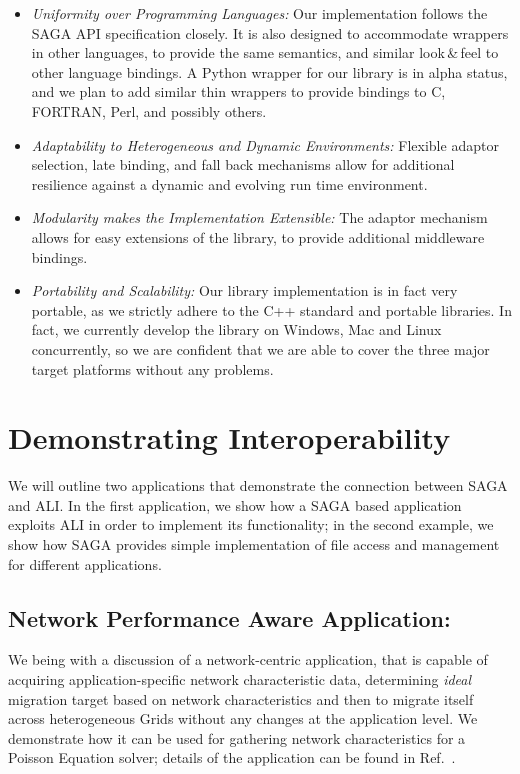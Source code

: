 \documentclass[conference,final]{IEEEtran}
\newcommand{\I}{\textit}
\newenvironment{shortlist}{
  \begin{itemize}
  \setlength{\itemsep}{-0.1em}
}{
  \end{itemize}
}
\begin{document}
\begin{shortlist}
\item \I{Uniformity over Programming Languages:} Our implementation
  follows the SAGA API specification closely. It is also designed to
  accommodate wrappers in other languages, to provide the same
  semantics, and similar look\,\&\,feel to other language bindings.  A
  Python wrapper for our library is in alpha status, and we plan to
  add similar thin wrappers to provide bindings to C, FORTRAN, Perl,
  and possibly others.
\item \I{Adaptability to Heterogeneous and Dynamic Environments:}
  Flexible adaptor selection, late binding, and fall back mechanisms
  allow for additional resilience against a dynamic and evolving run
  time environment.
\item \I{Modularity makes the Implementation Extensible:} The
  adaptor mechanism allows for easy extensions of the library, to
  provide additional middleware bindings.
\item \I{Portability and Scalability:} Our library implementation is
  in fact very portable, as we strictly adhere to the C++ standard and
  portable libraries.  In fact, we currently develop the library on
  Windows, Mac and Linux concurrently, so we are confident that we are
  able to cover the three major target platforms without any problems.
\end{shortlist}


\section{Demonstrating Interoperability}\label{sec:app}

We will outline two applications that demonstrate the connection
between SAGA and ALI. In the first application, we show how a SAGA
based application exploits ALI in order to implement its
functionality; in the second example, we show how SAGA provides 
simple implementation of file access and management for different 
applications.

\subsection{Network Performance Aware Application:}
We being with a discussion of a network-centric application, that is
capable of acquiring application-specific network characteristic data,
determining {\it ideal} migration target based on network
characteristics and then to migrate itself across heterogeneous Grids
without any changes at the application level.  We demonstrate how it
can be used for gathering network characteristics for a Poisson
Equation solver; details of the
application %
can be found in Ref.~\cite{saga_escience2007}.
\end{document}
